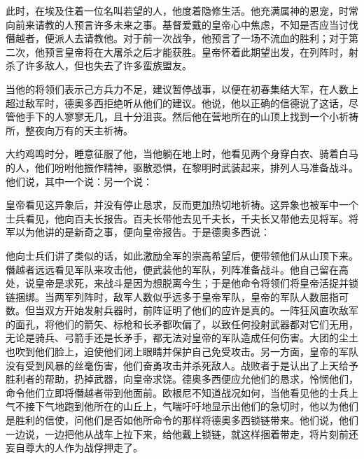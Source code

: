 此时，在埃及住着一位名叫若望的人，他度着隐修生活。他充满属神的恩宠，时常向前来请教的人预言许多未来之事。基督爱戴的皇帝心中焦虑，不知是否应当讨伐僭越者，便派人去请教他。对于前一次战争，他预言了一场不流血的胜利；对于第二次，他预言皇帝将在大屠杀之后才能获胜。皇帝怀着此期望出发，在列阵时，射杀了许多敌人，但也失去了许多蛮族盟友。\par

当他的将领们表示己方兵力不足，建议暂停战事，以便在初春集结大军，在人数上超过敌军时，德奥多西拒绝听从他们的建议。他说，他以正确的信德说了这话，尽管他手下的人寥寥无几，且十分沮丧。然后他在营地所在的山顶上找到一个小祈祷所，整夜向万有的天主祈祷。\par

大约鸡鸣时分，睡意征服了他，当他躺在地上时，他看见两个身穿白衣、骑着白马的人，他们吩咐他振作精神，驱散恐惧，在黎明时武装起来，排列人马准备战斗。他们说，其中一个说：另一个说：\par

皇帝看见这异象后，并没有停止恳求，反而更加热切地祈祷。这异象也被军中一个士兵看见，他向百夫长报告。百夫长带他去见千夫长，千夫长又带他去见将军。将军以为他讲的是新奇之事，便向皇帝报告。于是德奥多西说：\par

他向士兵们讲了类似的话，如此激励全军的崇高希望后，便带领他们从山顶下来。僭越者远远看见军队来攻击他，便武装他的军队，列阵准备战斗。他自己留在高处，说皇帝是求死，来战斗是因为想脱离今生；于是他命令将领们将皇帝活捉并锁链捆绑。当两军列阵时，敌军人数似乎远多于皇帝军队，皇帝的军队人数屈指可数。但当双方开始发射兵器时，前阵证明了他们的应许是真的。一阵狂风直吹敌军的面孔，将他们的箭矢、标枪和长矛都吹偏了，以致任何投射武器都对它们无用，无论是骑兵、弓箭手还是长矛手，都无法对皇帝的军队造成任何伤害。大团的尘土也吹到他们脸上，迫使他们闭上眼睛并保护自己免受攻击。另一方面，皇帝的军队没有受到风暴的丝毫伤害，他们奋勇攻击并杀死敌人。战败者于是认出了上天给予胜利者的帮助，扔掉武器，向皇帝求饶。德奥多西便应允他们的恳求，怜悯他们，命令他们立即将僭越者带到他面前。欧根尼不知道战况如何，当他看见他的士兵上气不接下气地跑到他所在的山丘上，气喘吁吁地显示出他们的急切时，他以为他们是胜利的信使，问他们是否如他所命令的那样将德奥多西锁链带来。他们说，他们一边说，一边把他从战车上拉下来，给他戴上锁链，就这样捆着带走，将片刻前还妄自尊大的人作为战俘押走了。\par

